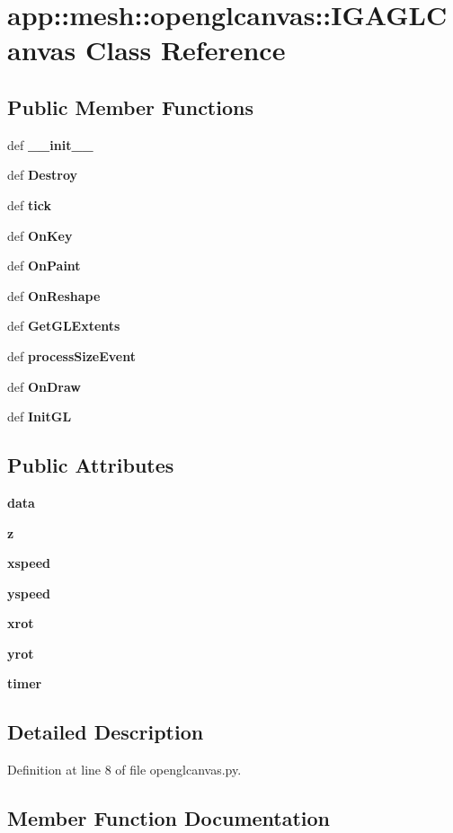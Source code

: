 \section{app::mesh::openglcanvas::IGAGLCanvas Class Reference}
\label{classapp_1_1mesh_1_1openglcanvas_1_1IGAGLCanvas}
\subsection*{Public Member Functions}
\begin{CompactItemize}
\item 
def {\bf \_\-\_\-init\_\-\_\-}
\item 
def {\bf Destroy}
\item 
def {\bf tick}
\item 
def {\bf OnKey}
\item 
def {\bf OnPaint}
\item 
def {\bf OnReshape}
\item 
def {\bf GetGLExtents}
\item 
def {\bf processSizeEvent}
\item 
def {\bf OnDraw}
\item 
def {\bf InitGL}
\end{CompactItemize}
\subsection*{Public Attributes}
\begin{CompactItemize}
\item 
{\bf data}
\item 
{\bf z}
\item 
{\bf xspeed}
\item 
{\bf yspeed}
\item 
{\bf xrot}
\item 
{\bf yrot}
\item 
{\bf timer}
\end{CompactItemize}


\subsection{Detailed Description}


Definition at line 8 of file openglcanvas.py.

\subsection{Member Function Documentation}

